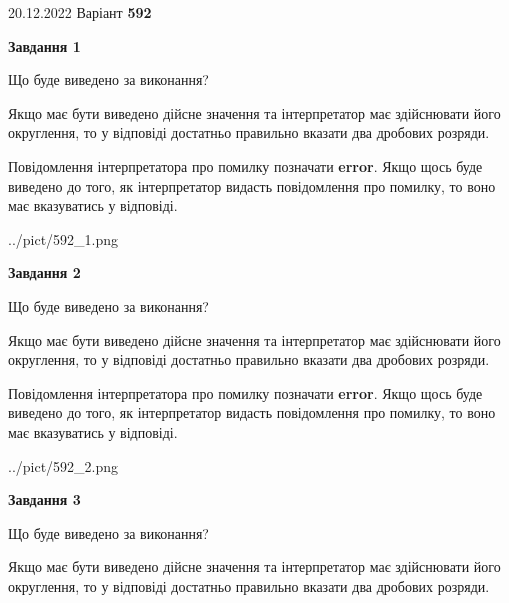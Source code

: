 \documentclass[12pt, ukrainian]{article}
\begin{document}
{20.12.2022 Варіант \No \textbf { 592 }\par}
{
\begin {Large}

{\begin {center}\textbf{Завдання 1}\end {center}}\par
Що буде виведено за виконання? \par

Якщо має бути виведено дійсне значення та інтерпретатор має здійснювати його округлення, 
то у відповіді достатньо правильно вказати два дробових розряди.

Повідомлення інтерпретатора про помилку позначати \textbf{error}.
Якщо щось буде виведено до того, як інтерпретатор видасть повідомлення про помилку, 
то воно має вказуватись у відповіді. \par

\begin{center}
	{../pict/592_1.png}
\end{center}
\newpage

{\begin {center}\textbf{Завдання 2}\end {center}}\par
Що буде виведено за виконання? \par

Якщо має бути виведено дійсне значення та інтерпретатор має здійснювати його округлення, 
то у відповіді достатньо правильно вказати два дробових розряди.

Повідомлення інтерпретатора про помилку позначати \textbf{error}.
Якщо щось буде виведено до того, як інтерпретатор видасть повідомлення про помилку, 
то воно має вказуватись у відповіді. \par

\begin{center}
	{../pict/592_2.png}
\end{center}
\newpage

{\begin {center}\textbf{Завдання 3}\end {center}}\par
Що буде виведено за виконання? \par

Якщо має бути виведено дійсне значення та інтерпретатор має здійснювати його округлення, 
то у відповіді достатньо правильно вказати два дробових розряди.


\end{Large}}
\end{document}
